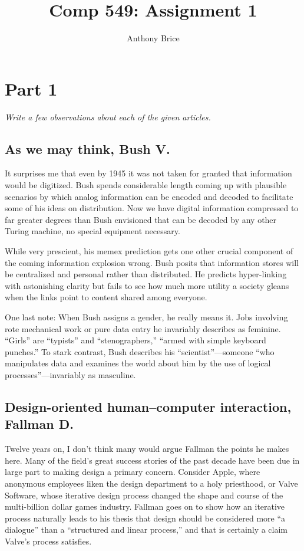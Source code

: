 \documentclass{abrice}
\title{Comp 549: Assignment 1}
\author{Anthony Brice}
\begin{document}
\maketitle

\section{Part 1}

\emph{Write a few observations about each of the given articles.}

\subsection{As we may think, Bush V.}

It surprises me that even by 1945 it was not taken for granted that information
would be digitized. Bush spends considerable length coming up with plausible
scenarios by which analog information can be encoded and decoded to facilitate
some of his ideas on distribution. Now we have digital information compressed to
far greater degrees than Bush envisioned that can be decoded by any other Turing
machine, no special equipment necessary.

While very prescient, his memex prediction gets one other crucial component of
the coming information explosion wrong. Bush posits that information stores will
be centralized and personal rather than distributed. He predicts hyper-linking
with astonishing clarity but fails to see how much more utility a society gleans
when the links point to content shared among everyone.

One last note: When Bush assigns a gender, he really means it. Jobs involving
rote mechanical work or pure data entry he invariably describes as
feminine. ``Girls'' are ``typists'' and ``stenographers,'' ``armed with simple
keyboard punches.'' To stark contrast, Bush describes his
``scientist''---someone ``who manipulates data and examines the world about him
by the use of logical processes''---invariably as masculine.


\subsection{Design-oriented human--computer interaction, Fallman D.}

\indent
Twelve years on, I don't think many would argue Fallman the points he makes
here. Many of the field's great success stories of the past decade have been due
in large part to making design a primary concern. Consider Apple, where
anonymous employees liken the design department to a holy priesthood, or Valve
Software, whose iterative design process changed the shape and course of the
multi-billion dollar games industry. Fallman goes on to show how an iterative
process naturally leads to his thesis that design should be considered more ``a
dialogue'' than a ``structured and linear process,'' and that is certainly a
claim Valve's process satisfies.
\end{document}
